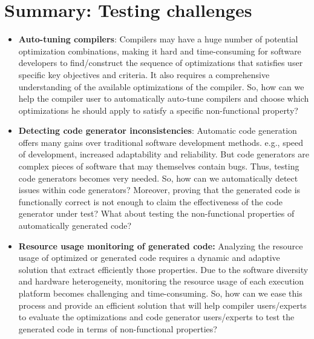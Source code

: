 \section{Summary: Testing challenges}

\begin{itemize}
	\item \textbf{Auto-tuning compilers}: 
	Compilers may have a huge number of potential optimization combinations, making it hard and time-consuming for software developers to find/construct the sequence of optimizations that satisfies user specific key objectives and criteria. It also requires a comprehensive understanding of the available optimizations of the compiler.  
	So, how can we help the compiler user to automatically auto-tune compilers and choose which optimizations he should apply to satisfy a specific non-functional property? 
	
		
	\item \textbf{Detecting code generator inconsistencies}: 
    Automatic code generation offers many gains over traditional software development methods. e.g., speed of development, increased adaptability and reliability. But code generators are complex pieces of software that may themselves contain bugs. Thus, testing code generators becomes very needed.
	So, how can we automatically detect issues within code generators? 
	Moreover, proving that the generated code is functionally correct is not enough to claim the effectiveness of the code generator under test?
	What about testing the non-functional properties of automatically generated code?
	
	
	
	\item \textbf{Resource usage monitoring of generated code:} Analyzing the resource usage of optimized or generated code requires a dynamic and adaptive solution that extract efficiently those properties. Due to the software diversity and hardware heterogeneity, monitoring the resource usage of each execution platform becomes challenging and time-consuming. So, how can we ease this process and provide an efficient solution that will help compiler users/experts to evaluate the optimizations and code generator users/experts to test the generated code in terms of non-functional properties?
	

\end{itemize}


%
